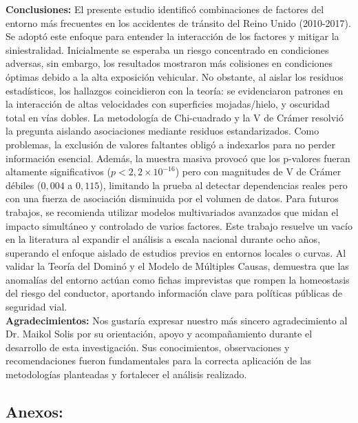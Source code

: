 \documentclass[12pt]{article}
\begin{document}
\textbf{Conclusiones:}
  El presente estudio identificó combinaciones de factores del entorno más frecuentes en los accidentes de tránsito del Reino Unido (2010-2017). Se adoptó este enfoque para entender la interacción de los factores y mitigar la siniestralidad. Inicialmente se esperaba un riesgo concentrado en condiciones adversas, sin embargo, los resultados mostraron más colisiones en condiciones óptimas debido a la alta exposición vehicular. No obstante, al aislar los residuos estadísticos, los hallazgos coincidieron con la teoría: se evidenciaron patrones en la interacción de altas velocidades con superficies mojadas/hielo, y oscuridad total en vías dobles.
  La metodología de Chi-cuadrado y la V de Crámer resolvió la pregunta aislando asociaciones mediante residuos estandarizados. Como problemas, la exclusión de valores faltantes obligó a indexarlos para no perder información esencial. Además, la muestra masiva provocó que los p-valores fueran altamente significativos ($p < 2,2 \times 10^{-16}$) pero con magnitudes de V de Crámer débiles ($0,004$ a $0,115$), limitando la prueba al detectar dependencias reales pero con una fuerza de asociación disminuida por el volumen de datos. Para futuros trabajos, se recomienda utilizar modelos multivariados avanzados que midan el impacto simultáneo y controlado de varios factores.
  Este trabajo resuelve un vacío en la literatura al expandir el análisis a escala nacional durante ocho años, superando el enfoque aislado de estudios previos en entornos locales o curvas. Al validar la Teoría del Dominó y el Modelo de Múltiples Causas, demuestra que las anomalías del entorno actúan como fichas imprevistas que rompen la homeostasis del riesgo del conductor, aportando información clave para políticas públicas de seguridad vial.\\

  \textbf{Agradecimientos:}
Nos gustaría expresar nuestro más sincero agradecimiento al Dr. Maikol Solis por 
su orientación, apoyo y acompañamiento durante el desarrollo de esta investigación. 
Sus conocimientos, observaciones y recomendaciones fueron fundamentales para la 
correcta aplicación de las metodologías planteadas y fortalecer el análisis realizado. 
\newpage
\printbibliography

\subsection{Anexos:}
\end{document}
